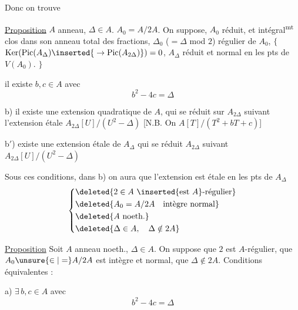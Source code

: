 Donc on trouve

\uline{Proposition} $A$ anneau, $\Delta\in A$. $A_0=A/2A$. On suppose,  $A_0$ réduit, et intégral\textsuperscript{mt} clos dans son anneau total des fractions, $\Delta_0$ ($=\Delta$ mod $2$)  régulier de $A_0$, 
$\{$ $\operatorname{Ker}(\operatorname{Pic}(A_{\Delta})\inserted{{}\to\operatorname{Pic}(A_{2\Delta})})=0$, $A_{\Delta}$ réduit et  normal   en les pts de $V(A_0)$. $\}$

   il existe $b,c\in A$ avec
\[
b^2-4c=\Delta
\]

 b) il existe une extension quadratique de $A$,  qui se réduit sur $A_{2\Delta}$ suivant l'extension étale $A_{2\Delta}[U]/(U^2-\Delta)$ [N.B. On  $A[T]/(T^2+bT+c)$]

b$'$)  existe une extension  étale de $A_{\Delta}$ qui se réduit   $A_{2\Delta}$ suivant $A_{2\Delta}[U]/(U^2-\Delta)$

Sous ces conditions, dans b) on aura  que l'extension est étale en les pts de $A_{\Delta}$
\[
\left\{\begin{aligned}&\deleted{2\in A\ \inserted{\text{est }A}\text{-régulier}}\\&\deleted{A_0=A/2A\quad\text{intègre normal}}\\&\deleted{A\ \text{noeth.}}\\&\deleted{\Delta\in A,\quad\Delta\notin2A}\end{aligned}\right.
\]

\uline{Proposition} Soit $A$ anneau noeth., $\Delta\in A$. On suppose que $2$ est $A$-régulier, que $A_0\unsure{\in|=}A/2A$ est intègre et normal, que $\Delta\notin2A$. Conditions équivalentes :

a) $\exists\, b,c\in A$ avec
\[
b^2-4c=\Delta
\]


